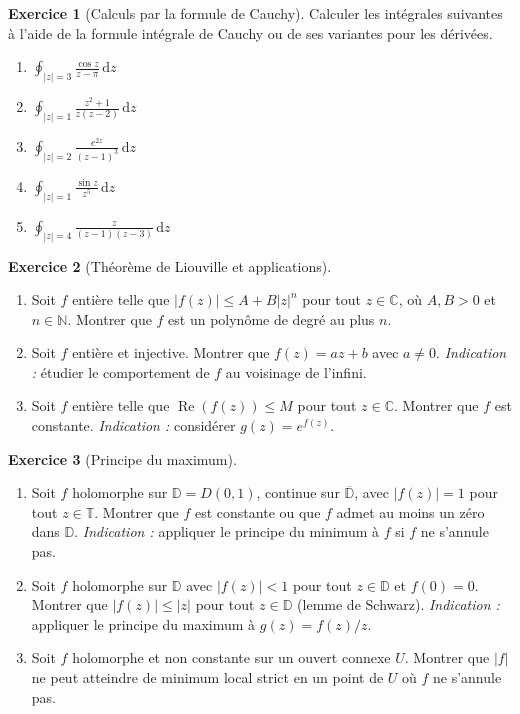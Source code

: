 \documentclass[12pt,a4paper,openany]{book}
\theoremstyle{definition}
\newtheorem{exercice}{Exercice}[chapter]
\theoremstyle{plain}
\theoremstyle{remark}
\newcommand{\C}{\mathbb{C}}
\newcommand{\N}{\mathbb{N}}
\newcommand{\D}{\mathbb{D}}
\newcommand{\T}{\mathbb{T}}
\DeclareMathOperator{\re}{Re}
\newcommand{\dd}{\mathrm{d}}
\newcommand{\abs}[1]{\left|#1\right|}
\begin{document}
\begin{exercice}[Calculs par la formule de Cauchy]\label{exo:cauchy-calculs}
Calculer les intégrales suivantes à l'aide de la formule intégrale de
Cauchy ou de ses variantes pour les dérivées.
\begin{enumerate}[label=\textbf{\alph*)}]
  \item $\displaystyle\oint_{\abs{z}=3} \frac{\cos z}{z - \pi}\,\dd z$
  \item $\displaystyle\oint_{\abs{z}=1} \frac{z^2 + 1}{z(z-2)}\,\dd z$
  \item $\displaystyle\oint_{\abs{z}=2} \frac{e^{2z}}{(z-1)^3}\,\dd z$
  \item $\displaystyle\oint_{\abs{z}=1} \frac{\sin z}{z^5}\,\dd z$
  \item $\displaystyle\oint_{\abs{z}=4}
        \frac{z}{(z-1)(z-3)}\,\dd z$
\end{enumerate}
\end{exercice}

\begin{exercice}[Théorème de Liouville et applications]\label{exo:liouville}
\begin{enumerate}[label=\textbf{\alph*)}]
  \item Soit $f$ entière telle que $\abs{f(z)} \leq A + B\abs{z}^n$
        pour tout $z \in \C$, où $A, B > 0$ et $n \in \N$. Montrer
        que $f$ est un polynôme de degré au plus $n$.
  \item Soit $f$ entière et injective. Montrer que $f(z) = az + b$
        avec $a \neq 0$.
        \emph{Indication :} étudier le comportement de $f$ au voisinage
        de l'infini.
  \item Soit $f$ entière telle que $\re(f(z)) \leq M$ pour tout
        $z \in \C$. Montrer que $f$ est constante.
        \emph{Indication :} considérer $g(z) = e^{f(z)}$.
\end{enumerate}
\end{exercice}

\begin{exercice}[Principe du maximum]\label{exo:max-principle}
\begin{enumerate}[label=\textbf{\alph*)}]
  \item Soit $f$ holomorphe sur $\D = D(0,1)$, continue sur
        $\overline{\D}$, avec $\abs{f(z)} = 1$ pour tout $z \in \T$.
        Montrer que $f$ est constante ou que $f$ admet au moins un zéro
        dans $\D$.
        \emph{Indication :} appliquer le principe du minimum à $f$ si
        $f$ ne s'annule pas.
  \item Soit $f$ holomorphe sur $\D$ avec $\abs{f(z)} < 1$ pour tout
        $z \in \D$ et $f(0) = 0$. Montrer que $\abs{f(z)} \leq \abs{z}$
        pour tout $z \in \D$ (lemme de Schwarz).
        \emph{Indication :} appliquer le principe du maximum à
        $g(z) = f(z)/z$.
  \item Soit $f$ holomorphe et non constante sur un ouvert connexe $U$.
        Montrer que $\abs{f}$ ne peut atteindre de minimum local strict
        en un point de $U$ où $f$ ne s'annule pas.
\end{enumerate}
\end{exercice}
\end{document}

